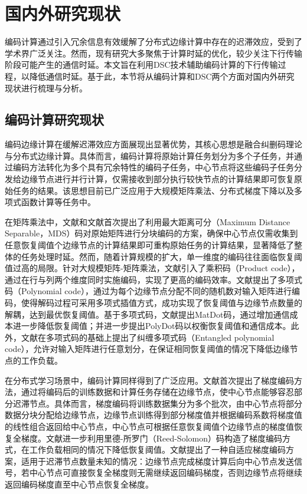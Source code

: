 \section{国内外研究现状}
编码计算通过引入冗余信息有效缓解了分布式边缘计算中存在的迟滞效应，受到了学术界广泛关注。然而，现有研究大多聚焦于计算时延的优化，较少关注下行传输阶段可能产生的通信时延。本文旨在利用DSC技术辅助编码计算的下行传输过程，以降低通信时延。基于此，本节将从编码计算和DSC两个方面对国内外研究现状进行梳理与分析。


\subsection{编码计算研究现状}

编码边缘计算在缓解迟滞效应方面展现出显著优势，其核心思想是融合纠删码理论与分布式边缘计算。具体而言，编码计算将原始计算任务划分为多个子任务，并通过编码方法转化为多个具有冗余特性的编码子任务，中心节点将这些编码子任务分发给边缘节点进行并行计算，仅需接收到部分执行较快节点的计算结果即可恢复原始任务的结果。该思想目前已广泛应用于大规模矩阵乘法、分布式梯度下降以及多项式函数计算等任务中。

在矩阵乘法中，文献\cite{8002642}和文献\cite{8006963}首次提出了利用最大距离可分（Maximum Distance Separable，MDS）码对原始矩阵进行分块编码的方案，确保中心节点仅需收集到任意恢复阈值个边缘节点的计算结果即可重构原始任务的计算结果，显著降低了整体的任务处理时延。然而，随着计算规模的扩大，单一维度的编码往往面临恢复阈值过高的局限。针对大规模矩阵-矩阵乘法，文献\cite{720548}引入了乘积码（Product code），通过在行与列两个维度同时实施编码，实现了更高的编码效率。文献\cite{yu2017polynomial}提出了多项式码（Polynomial code），通过为每个边缘节点分配不同的随机数对输入矩阵进行编码，使得解码过程可采用多项式插值方式，成功实现了恢复阈值与边缘节点数量的解耦，达到最优恢复阈值。基于多项式码，文献\cite{dutta2019optimal}提出MatDot码，通过增加通信成本进一步降低恢复阈值；并进一步提出PolyDot码以权衡恢复阈值和通信成本。此外，文献\cite{yu2020straggler}在多项式码的基础上提出了纠缠多项式码（Entangled polynomial code），允许对输入矩阵进行任意划分，在保证相同恢复阈值的情况下降低边缘节点的工作负载。

在分布式学习场景中，编码计算同样得到了广泛应用。文献\cite{tandon2017gradient}首次提出了梯度编码方法，通过将编码后的训练数据和计算任务存储在边缘节点，使中心节点能够容忍部分迟滞节点。具体而言，梯度编码将训练数据集分为多个批次，由中心节点将部分数据分块分配给边缘节点，边缘节点训练得到部分梯度值并根据编码系数将梯度值的线性组合返回给中心节点，中心节点可根据任意恢复阈值个边缘节点的梯度值恢复全梯度。文献\cite{halbawi2018improving}进一步利用里德-所罗门（Reed-Solomon）码构造了梯度编码方式，在工作负载相同的情况下降低恢复阈值。文献\cite{cao2021adaptive}提出了一种自适应梯度编码方案，适用于迟滞节点数量未知的情况：边缘节点完成梯度计算后向中心节点发送信号，若中心节点可直接恢复全梯度则无需继续返回编码梯度，否则边缘节点将继续返回编码梯度直至中心节点恢复全梯度。

